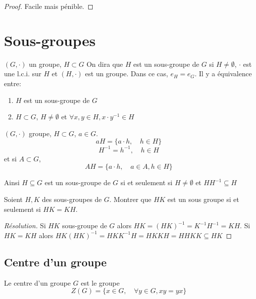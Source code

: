\begin{proof}
    Facile mais pénible.
\end{proof}

\section{Sous-groupes}

\begin{thmdef}
    \Hyp $(G, \cdot)$ un groupe, $H\subset G$
    \Conc On dira que $H$ est un sous-groupe de $G$ si $H\neq \emptyset$, $\cdot$ est une l.c.i. sur $H$ et $(H, \cdot)$ est un groupe. Dans ce cas, $e_H=e_G$. Il y a équivalence entre: \begin{enumerate}[label=(\alph*)]
        \item $H$ est un sous-groupe de $G$
        \item $H\subset G$, $H\neq \emptyset$ et $\forall x, y\in H, x\cdot y^{-1}\in H$
    \end{enumerate}
\end{thmdef}

\begin{notation}
    $(G, \cdot)$ groupe, $H\subset G$, $a\in G$. \[
        aH=\{a\cdot h, \quad h\in H\}
    \]
    \[
        H^{-1}={h^{-1}, \quad h\in H}
    \]
    et si $A\subset G$,
    \[
        AH = \{a\cdot h, \quad a\in A, h\in H\}
    \]
\end{notation}

Ainsi $H\subseteq G$ est un sous-groupe de $G$ si et seulement si $H\neq \emptyset$ et $HH^{-1}\subseteq H$

\begin{exo}
    Soient $H, K$ des sous-groupes de $G$. Montrer que $HK$ est un sous groupe si et seulement si $HK=KH$.
\end{exo}

\begin{proof}[Résolution]
    Si $HK$ sous-groupe de $G$ alors $HK=(HK)^{-1}=K^{-1}H^{-1}=KH$. Si $HK=KH$ alors $HK(HK)^{-1}=HKK^{-1}H=HKKH=HHKK\subseteq HK$
\end{proof}

\subsection{Centre d'un groupe}

\begin{dfn}
    Le centre d'un groupe $G$ est le groupe \[
        Z(G)=\{x\in G, \quad \forall y\in G, xy=yx\}
    \]
\end{dfn}

